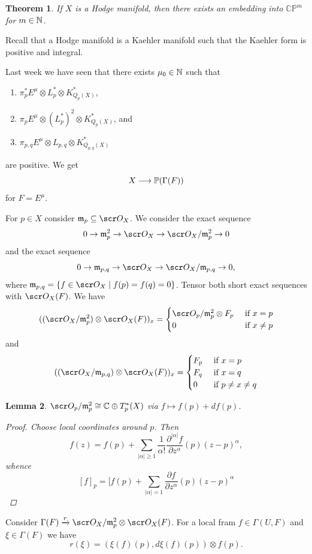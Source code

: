 \documentclass[A4paper, british]{amsart}
\theoremstyle{darkgreentheorem}
\newtheorem{thm}{Theorem}[section]
\newtheorem{lm}[thm]{Lemma}
\theoremstyle{darkbluedefinition}
\theoremstyle{darkredexample}
\theoremstyle{remark}
\newcommand{\CP}{\mathbb{CP}}
\newcommand{\1}{\mathbbm{1}}
\newcommand{\ot}{\otimes}
\newcommand{\op}{\oplus}
\newcommand{\sub}{\subseteq}
\begin{document}
\begin{thm}
    If $X$ is a Hodge manifold, then there exists an embedding into $\CP^{m}$ for $m\in \N$.
\end{thm}

Recall that a Hodge manifold is a Kaehler manifold such that the Kaehler form is positive and integral.

Last week we have seen that there exists $\mu_{0}\in \N$ such that
\begin{enumerate}[label=\roman*)]
    \item $\pi_{p}^{*}E^{\mu}\ot L_{p}^{*}\ot K_{Q_{p}(X)}^{*}$,
    \item $\pi_{p}E^{\mu}\ot (L_{p}^{*})^{2}\ot K_{Q_{p}(X)}^{*}$, and
    \item $\pi_{p,q}E^{\mu}\ot L_{p,q}\ot K_{Q_{p,q}(X)}^{*}$
\end{enumerate}
are positive.
We get
\[ X\longrightarrow \P(\Gamma(F))\]
for $F=E^{\mu}$.

For $p\in X$ consider $\m_{p}\sub \O_{X}$.
We consider the exact sequence
\[ 0\to \m_{p}^{2}\to \O_{X}\to \O_{X}/\m_{p}^{2}\to 0\]
and the exact sequence
\[ 0\to \m_{p,q}\to \O_{X}\to \O_{X}/\m_{p,q} \to 0, \]
where $\m_{p,q}=\{f\in \O_{X}\mid f(p)=f(q)=0 \}$.
Tensor both short exact sequences with $\O_{X}(F)$.
We have
\[ ((\O_{X}/\m_{p}^{2})\ot \O_{X}(F))_{x}=\begin{cases} \O_{p}/\m_{p}^{2}\ot F_{p} &\text{ if }x=p \\
    0 &\text{ if }x\neq p
\end{cases}\]
and
\[ ((\O_{X}/\m_{p,q})\ot \O_{X}(F))_{x}=\begin{cases} F_{p} &\text{ if } x=p \\
    F_{q} &\text{ if }x=q \\
    0 &\text{ if }p\neq x\neq q
\end{cases} \]

\begin{lm}
    $\O_{p}/\m_{p}^{2}\cong \C\op T_{p}^{*}(X)$ via $f\mapsto f(p)+df(p)$.
    \begin{proof}
	Choose local coordinates around $p$.
	Then
	\[ f(z)=f(p)+\sum_{|\alpha|\geqslant 1}\frac{1}{\alpha !}\frac{\partial^{|\alpha|} f}{\partial z^{\alpha}}(p)(z-p)^{\alpha}, \]
	whence
	\[ [f]_{p}=[f(p)+\sum_{|\alpha|=1}\frac{\partial f}{\partial z^{\alpha}}(p)(z-p)^{\alpha} \]
    \end{proof}
\end{lm}

Consider $\Gamma(F)\xrightarrow{r} \O_{X}/\m_{p}^{2}\ot \O_{X}(F) $.
For a local fram $f\in \Gamma(U,F)$ and $\xi\in \Gamma(F)$ we have
\[ r(\xi)=(\xi(f)(p),d\xi(f)(p))\ot f(p). \]
\end{document}
